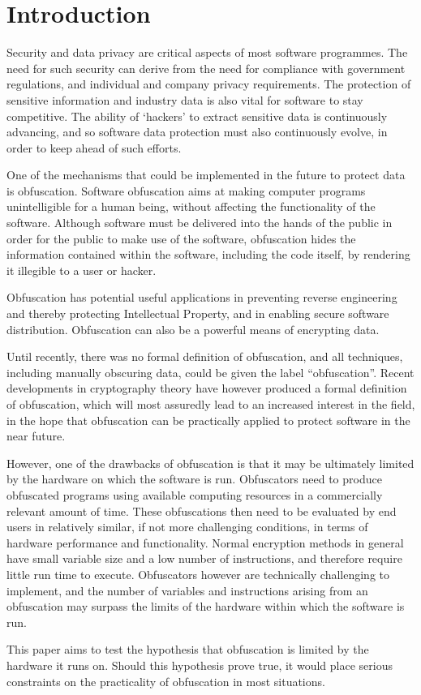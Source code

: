 \section{Introduction}
Security and data privacy are critical aspects of most software programmes. The need for such security can derive from the need for compliance with government regulations, and individual and company privacy requirements. The protection of sensitive information and industry data is also vital for software to stay competitive. The ability of ‘hackers’ to extract sensitive data is continuously advancing, and so software data protection must also continuously evolve, in order to keep ahead of such efforts.
\par
One of the mechanisms that could be implemented in the future to protect data is obfuscation. 
Software obfuscation aims at making computer programs unintelligible for a human being, without affecting the functionality of the software. Although software must be delivered into the hands of the public in order for the public to make use of the software, obfuscation hides the information contained within the software, including the code itself, by rendering it illegible to a user or hacker.
\par
Obfuscation has potential useful applications in preventing reverse engineering and thereby protecting Intellectual Property, and in enabling secure software distribution. Obfuscation can also be a powerful means of encrypting data.
\par
Until recently, there was no formal definition of obfuscation, and all techniques, including manually obscuring data, could be given the label “obfuscation”. Recent developments in cryptography theory have however produced a formal definition of obfuscation, which will most assuredly lead to an increased interest in the field, in the hope that obfuscation can be practically applied to protect software in the near future.
\par
However, one of the drawbacks of obfuscation is that it may be ultimately limited by the hardware on which the software is run. Obfuscators need to produce obfuscated programs using available computing resources in a commercially relevant amount of time. These obfuscations then need to be evaluated by end users in relatively similar, if not more challenging conditions, in terms of hardware performance and functionality. Normal encryption methods in general have small variable size and a low number of instructions, and therefore require little run time to execute. Obfuscators however are technically challenging to implement, and the number of variables and instructions arising from an obfuscation may surpass the limits of the hardware within which the software is run.
\par
This paper aims to test the hypothesis that obfuscation is limited by the hardware it runs on. Should this hypothesis prove true, it would place serious constraints on the practicality of obfuscation in most situations. 
